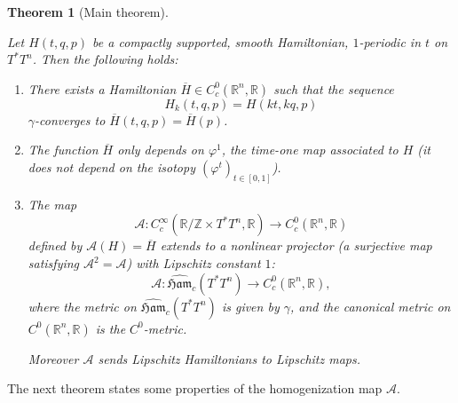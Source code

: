 \documentclass[JEP,XML,SOM,NoFloatCountersInSection,Unicode,published]{cedram}
\numberwithin{equation}{section}
\newcommand {\Ham}{{\mathfrak {Ham}}}
\newcommand{\gclHamc}[1]{\widehat{\Ham}_c(#1)}
\theoremstyle{plain}
\newtheorem{theorem}{Theorem}[section]
\theoremstyle{definition}
\theoremstyle{remark}
\begin{document}
\begin{theorem}[Main theorem]\label{Main-theorem}

Let $H(t,q,p)$ be a compactly supported, smooth Hamiltonian, $1$-periodic in $t$ on $T^*T^n$. Then the following holds:
\begin{enumerate}
\item \label{Main-theorem-1} There exists a Hamiltonian $\overline H \in C_{c}^0({\mathbb R}^n, {\mathbb R})$ such that the sequence
\[
H_{k} (t,q,p) = H(kt,kq,p)
\]
$\gamma$-converges to
$\overline{H}(t,q,p)= \overline H(p)$.

\item \label{Main-theorem-2} The function $\overline H$ only depends on $\varphi^1$, the time-one map associated to $H$
(\ie it does not depend on the isotopy $(\varphi^t)_{t\in [0,1]}$).

\item \label{Main-theorem-3}The map
\[
\mathcal{A}: C_{c}^{\infty} ({\mathbb R}/ \mathbb Z \times T^{*} T^{n}, \mathbb{R}) \to C_{c}^{0}
(\mathbb{R}^{n},\mathbb{R})
\]
defined by $\mathcal{A}(H) = \overline{H}$ extends to a nonlinear projector (\ie a surjective map satisfying ${\mathcal A}^2= {\mathcal A}$) with Lipschitz constant $1$:
\[
\mathcal{A}: \gclHamc { T^{*} T^{n}} \to
C_{c}^{0}(\mathbb{R}^{n},\mathbb{R}),
\]
where the metric on $\gclHamc{ T^{*} T^{n}}$ is given by $\gamma$, and the canonical metric on
$C^{0}(\mathbb{R}^{n},\mathbb{R})$ is the $C^{0}$-metric.

Moreover $\mathcal A$ sends Lipschitz Hamiltonians to Lipschitz maps.
\end{enumerate}
\end{theorem}

The next theorem states some properties of the homogenization map $\mathcal{A}$.
\end{document}

